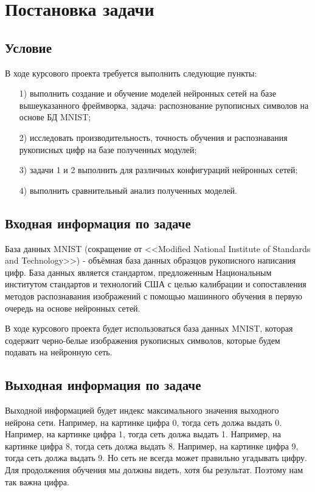\section{Постановка задачи}

\subsection{Условие}

В ходе курсового проекта требуется выполнить следующие пункты:

\begin{enumerate}
    \item[1)] выполнить создание и обучение моделей нейронных сетей на базе вышеуказанного фреймворка, задача: распознование рупописных символов на основе БД MNIST;
    \item[2)] исследовать производительность, точность обучения и распознавания рукописных цифр на базе полученных модулей;
    \item[3)] задачи 1 и 2 выполнить для различных конфигураций нейронных сетей;
    \item[4)] выполнить сравнительный анализ полученных моделей.
\end{enumerate}

\subsection{Входная информация по задаче}

База данных MNIST (сокращение от <<Modified National Institute of Standards and Technology>>)
- объёмная база данных образцов рукописного написания цифр.
База данных является стандартом,
предложенным Национальным институтом стандартов и технологий США
с целью калибрации и сопоставления методов распознавания изображений
с помощью машинного обучения в первую очередь на основе нейронных сетей.

В ходе курсового проекта будет использоваться база данных MNIST,
которая содержит черно-белые изображения рукописных символов,
которые будем подавать на нейронную сеть.

\subsection{Выходная информация по задаче}

Выходной информацией будет индекс максимального значения выходного нейрона сети.
Например, на картинке цифра 0, тогда сеть должа выдать 0.
Например, на картинке цифра 1, тогда сеть должа выдать 1.
Например, на картинке цифра 8, тогда сеть должа выдать 8.
Например, на картинке цифра 9, тогда сеть должа выдать 9.
Но сеть не всегда может правильно угадывать цифру.
Для продолжения обучения мы должны видеть,
хотя бы результат.
Поэтому нам так важна цифра.